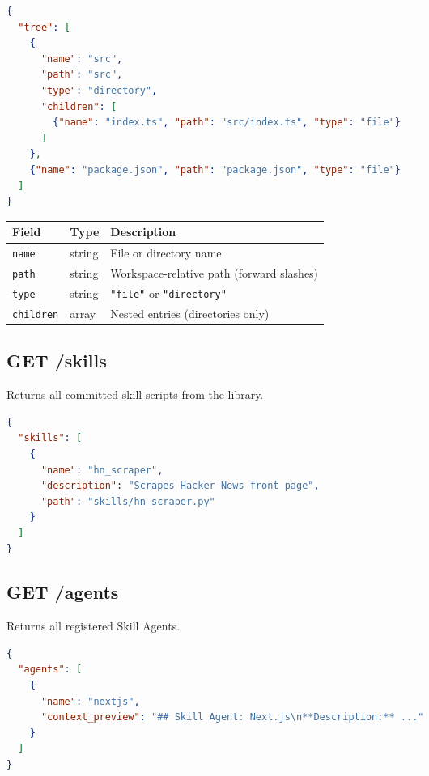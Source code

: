 \documentclass[11pt,a4paper]{article}
\newcommand{\httpget}{\textcolor{getgreen}{\textbf{GET}}}
\begin{document}
\begin{lstlisting}[language=json,title={Response body}]
{
  "tree": [
    {
      "name": "src",
      "path": "src",
      "type": "directory",
      "children": [
        {"name": "index.ts", "path": "src/index.ts", "type": "file"}
      ]
    },
    {"name": "package.json", "path": "package.json", "type": "file"}
  ]
}
\end{lstlisting}

\begin{table}[h!]
\centering
\begin{tabular}{@{}llp{7cm}@{}}
\toprule
\textbf{Field} & \textbf{Type} & \textbf{Description} \\
\midrule
\texttt{name} & string & File or directory name \\
\texttt{path} & string & Workspace-relative path (forward slashes) \\
\texttt{type} & string & \texttt{"file"} or \texttt{"directory"} \\
\texttt{children} & array & Nested entries (directories only) \\
\bottomrule
\end{tabular}
\end{table}

\subsection{\httpget{} /skills}

Returns all committed skill scripts from the library.

\begin{lstlisting}[language=json,title={Response body}]
{
  "skills": [
    {
      "name": "hn_scraper",
      "description": "Scrapes Hacker News front page",
      "path": "skills/hn_scraper.py"
    }
  ]
}
\end{lstlisting}

\subsection{\httpget{} /agents}

Returns all registered Skill Agents.

\begin{lstlisting}[language=json,title={Response body}]
{
  "agents": [
    {
      "name": "nextjs",
      "context_preview": "## Skill Agent: Next.js\n**Description:** ..."
    }
  ]
}
\end{lstlisting}
\end{document}

